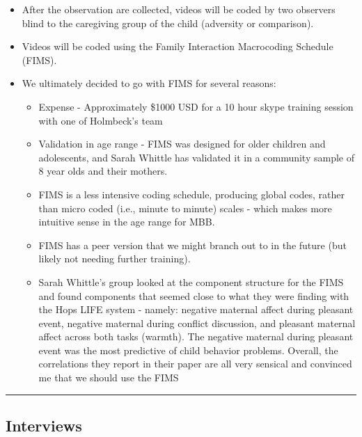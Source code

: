 \documentclass[
]{book}
\providecommand{\tightlist}{%
  \setlength{\itemsep}{0pt}\setlength{\parskip}{0pt}}
\begin{document}
\begin{itemize}
\item
  After the observation are collected, videos will be coded by two observers blind to the caregiving group of the child (adversity or comparison).
\item
  Videos will be coded using the Family Interaction Macrocoding Schedule (FIMS)\citep{holmbeck_1995}.
\item
  We ultimately decided to go with FIMS for several reasons:

  \begin{itemize}
  \tightlist
  \item
    Expense - Approximately \$1000 USD for a 10 hour skype training session with one of Holmbeck's team
  \item
    Validation in age range - FIMS was designed for older children and adolescents, and Sarah Whittle has validated it in a community sample of 8 year olds and their mothers.
  \item
    FIMS is a less intensive coding schedule, producing global codes, rather than micro coded (i.e., minute to minute) scales - which makes more intuitive sense in the age range for MBB.
  \item
    FIMS has a peer version that we might branch out to in the future (but likely not needing further training)\citep{holbein_2014}.
  \item
    Sarah Whittle's group looked at the component structure for the FIMS and found components that seemed close to what they were finding with the Hops LIFE system - namely: negative maternal affect during pleasant event, negative maternal during conflict discussion, and pleasant maternal affect across both tasks (warmth). The negative maternal during pleasant event was the most predictive of child behavior problems. Overall, the correlations they report in their paper are all very sensical and convinced me that we should use the FIMS \citep{richmond_2018}
  \end{itemize}
\end{itemize}

\begin{center}\rule{0.5\linewidth}{0.5pt}\end{center}

\hypertarget{interviews}{%
\subsection{Interviews}\label{interviews}}
\end{document}
